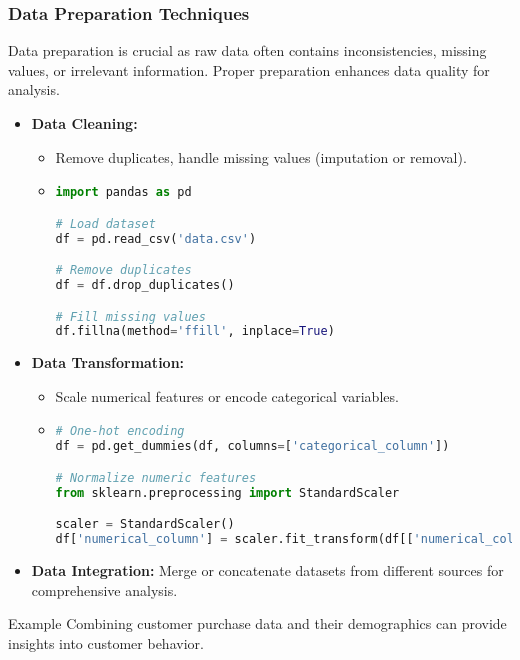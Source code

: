 \documentclass[aspectratio=169]{beamer}
\begin{document}
\begin{frame}[fragile]
  \frametitle{Data Preparation Techniques}
  Data preparation is crucial as raw data often contains inconsistencies, missing values, 
  or irrelevant information. Proper preparation enhances data quality for analysis.

  \begin{itemize}
    \item \textbf{Data Cleaning:} 
      \begin{itemize}
        \item Remove duplicates, handle missing values (imputation or removal).
        \item \begin{lstlisting}[language=Python]
import pandas as pd

# Load dataset
df = pd.read_csv('data.csv')

# Remove duplicates
df = df.drop_duplicates()

# Fill missing values
df.fillna(method='ffill', inplace=True)
        \end{lstlisting}
      \end{itemize}
    
    \item \textbf{Data Transformation:} 
      \begin{itemize}
        \item Scale numerical features or encode categorical variables.
        \item \begin{lstlisting}[language=Python]
# One-hot encoding
df = pd.get_dummies(df, columns=['categorical_column'])

# Normalize numeric features
from sklearn.preprocessing import StandardScaler

scaler = StandardScaler()
df['numerical_column'] = scaler.fit_transform(df[['numerical_column']])
        \end{lstlisting}
      \end{itemize}

    \item \textbf{Data Integration:} 
      Merge or concatenate datasets from different sources for comprehensive analysis.
  \end{itemize}

  \begin{block}{Example}
    Combining customer purchase data and their demographics can provide insights into customer behavior.
  \end{block}
\end{frame}
\end{document}
